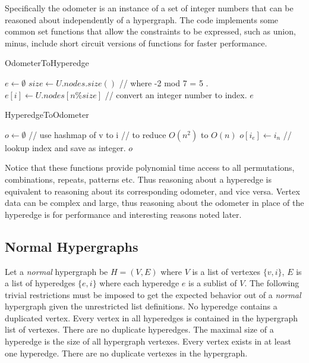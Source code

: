 Specifically the odometer is an instance of a set of integer numbers that can be reasoned about independently of a hypergraph. The code implements some common set functions that allow the constraints to be expressed, such as union, minus, include short circuit versions of functions for faster performance. 

\begin{algorithm}
	\caption{OdometerToHyperedge}\label{OtoE}
	\begin{algorithmic}[1]
		\State $e \gets \emptyset$
		\State $size \gets U.nodes.size()$
		\State // where -2 mod 7 = 5 .
		\State $e[i] \gets U.nodes[ n \% size ]$ // convert an integer number to index.
		\EndFor
		\State \Return $e$
		\EndFunction
	\end{algorithmic}
\end{algorithm}
\begin{algorithm}
	\caption{HyperedgeToOdometer}\label{EtoO}
	\begin{algorithmic}[1]
		\State $o \gets \emptyset$
		  // use hashmap of v to i
		 // to reduce $O(n^2)$ to $O(n)$
		\State $o[i_e] \gets i_n$ // lookup index and save as integer.
		\EndIf
		\EndFor
		\EndFor
		\State \Return $o$
		\EndFunction
	\end{algorithmic}
\end{algorithm}

Notice that these functions provide polynomial time access to all permutations, combinations, repeats, patterns etc. Thus reasoning about a hyperedge is equivalent to reasoning about its corresponding odometer, and vice versa. Vertex data can be complex and large, thus reasoning about the odometer in place of the hyperedge is for performance and interesting reasons noted later.
\newpage

\subsection{Normal Hypergraphs }
Let a \textit{normal} hypergraph \cite{Hypergraph:Book} be $H = (V,E)$ where $V$ is a list of vertexes $\{v,i\}$, $E$ is a list of hyperedges $\{e,i\}$ where each hyperedge $e$ is a sublist of $V$. The following trivial restrictions must be imposed to get the expected behavior out of a \textit{normal} hypergraph given the unrestricted list definitions. No hyperedge contains a duplicated vertex. Every vertex in all hyperedges is contained in the hypergraph list of vertexes. There are no duplicate hyperedges. The maximal size of a hyperedge is the size of all hypergraph vertexes. Every vertex exists in at least one hyperedge. There are no duplicate vertexes in the hypergraph.\\


